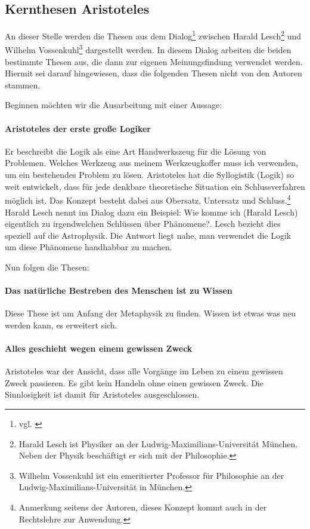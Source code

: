 \subsection{Kernthesen Aristoteles}

An dieser Stelle werden die Thesen aus dem Dialog\footnote{vgl. \cite{Aristoteles3}} zwischen Harald Lesch\footnote{Harald Lesch ist Physiker an der Ludwig-Maximilians-Universität München. Neben der Physik beschäftigt er sich mit der Philosophie.} und Wilhelm Vossenkuhl\footnote{Wilhelm Vossenkuhl ist ein emeritierter Professor für Philosophie an der Ludwig-Maximilians-Universität in München.} dargestellt werden. In diesem Dialog arbeiten die beiden bestimmte Thesen aus, die dann zur eigenen Meinungsfindung verwendet werden. Hiermit sei darauf hingewiesen, dass die folgenden Thesen nicht von den Autoren stammen.

Beginnen möchten wir die Ausarbeitung mit einer Aussage:
\paragraph{\glqq Aristoteles der erste große Logiker\grqq}
Er beschreibt die Logik als eine Art Handwerkszeug für die Lösung von Problemen. Welches Werkzeug aus meinem Werkzeugkoffer muss ich verwenden, um ein bestehendes Problem zu lösen. Aristoteles hat die Syllogistik (Logik) so weit entwickelt, dass für jede denkbare theoretische Situation ein Schlussverfahren möglich ist. Das Konzept besteht dabei aus Obersatz, Untersatz und Schluss.\footnote{Anmerkung seitens der Autoren, dieses Konzept kommt auch in der Rechtslehre zur Anwendung.} Harald Lesch nennt im Dialog dazu ein Beispiel: \glqq Wie komme ich (Harald Lesch) eigentlich zu irgendwelchen Schlüssen über Phänomene?\grqq. Lesch bezieht dies speziell auf die Astrophysik. Die Antwort liegt nahe, man verwendet die Logik um diese Phänomene handhabbar zu machen.

Nun folgen die Thesen:
\paragraph{Das natürliche Bestreben des Menschen ist zu Wissen}
Diese These ist am Anfang der Metaphysik zu finden. Wissen ist etwas was neu werden kann, es erweitert sich.  

\paragraph{Alles geschieht wegen einem gewissen Zweck} 
Aristoteles war der Ansicht, dass alle Vorgänge im Leben zu einem gewissen Zweck passieren. Es gibt kein Handeln ohne einen gewissen Zweck. Die Sinnlosigkeit ist damit für Aristoteles ausgeschlossen.

